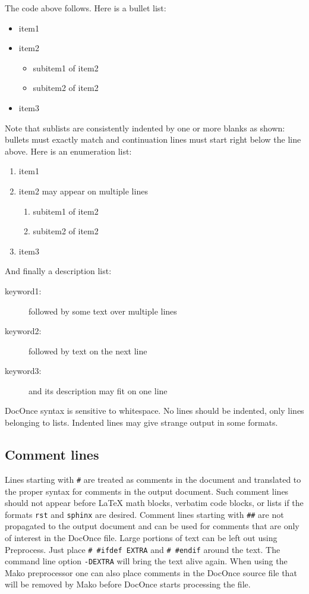 \documentclass[%
oneside,                 %
final,                   %
10pt]{article}
\newenvironment{warning_mdfboxadmon}[1][]{
\begin{warning_mdfboxmdframed}[frametitle=#1]
}
{
\end{warning_mdfboxmdframed}
}
\begin{document}
The code above follows.
Here is a bullet list:
\begin{itemize}
 \item item1
 \item item2
\begin{itemize}
  \item subitem1 of item2
  \item subitem2 of item2
\end{itemize}
\noindent
 \item item3
\end{itemize}
\noindent
Note that sublists are consistently indented by one or more blanks as
shown: bullets must exactly match and continuation lines must start
right below the line above.
Here is an enumeration list:
\begin{enumerate}
\item item1
\item item2
   may appear on
   multiple lines
\begin{enumerate}
 \item subitem1 of item2
 \item subitem2 of item2
\end{enumerate}
\noindent
\item item3
\end{enumerate}
\noindent
And finally a description list:
\begin{description}
 \item[keyword1:] 
   followed by
   some text
   over multiple
   lines
 \item[keyword2:] 
   followed by text on the next line
 \item[keyword3:] 
   and its description may fit on one line
\end{description}
\noindent

\begin{warning_mdfboxadmon}
DocOnce syntax is sensitive to whitespace.
No lines should be indented, only lines belonging to lists.
Indented lines may give strange output in some formats.
\end{warning_mdfboxadmon} %


\subsection{Comment lines}
Lines starting with \Verb!#! are treated as comments in the document and
translated to the proper syntax for comments in the output
document. Such comment lines should not appear before {\LaTeX} math
blocks, verbatim code blocks, or lists if the formats \texttt{rst} and
\texttt{sphinx} are desired.
Comment lines starting with \Verb!##! are not propagated to the output
document and can be used for comments that are only of interest in
the DocOnce file.
Large portions of text can be left out using Preprocess. Just place
\Verb!# #ifdef EXTRA! and \Verb!# #endif! around the text. The command line
option \texttt{-DEXTRA} will bring the text alive again.
When using the Mako preprocessor one can also place comments in
the DocOnce source file that will be removed by Mako before
DocOnce starts processing the file.
\end{document}
